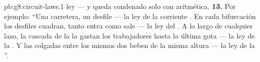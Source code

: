 \begin{solution}{pb:g8:circuit-laws:1}
ley --- y queda condenado solo con aritmética.
\textbf{13.} Por ejemplo: ``Una carretera, un desfile --- la ley de la
corriente . En cada bifurcación los desfiles cuadran, tanto
entra como sale --- la ley del . A lo largo de cualquier lazo,
la cascada de la  la gastan los trabajadores hasta la última
gota --- la ley de la  . Y las 
colgadas entre los mismos dos  beben de la misma altura ---
la ley de la  ''.
\end{solution}

